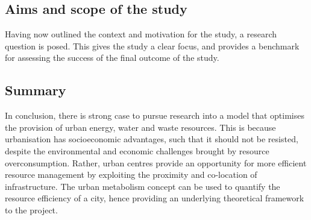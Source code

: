 
\subsection{Aims and scope of the study} \label{sec:aims}
Having now outlined the context and motivation for the study, a research question is posed. This gives the study a clear focus, and provides a benchmark for assessing the success of the final outcome of the study.


%

\subsection*{Summary}
In conclusion, there is strong case to pursue research into a model that optimises the provision of urban energy, water and waste resources. This is because urbanisation has socioeconomic advantages, such that it should not be resisted, despite the environmental and economic challenges brought by resource overconsumption. Rather, urban centres provide an opportunity for more efficient resource management by exploiting the proximity and co-location of infrastructure. The urban metabolism concept can be used to quantify the resource efficiency of a city, hence providing an underlying theoretical framework to the project.%
